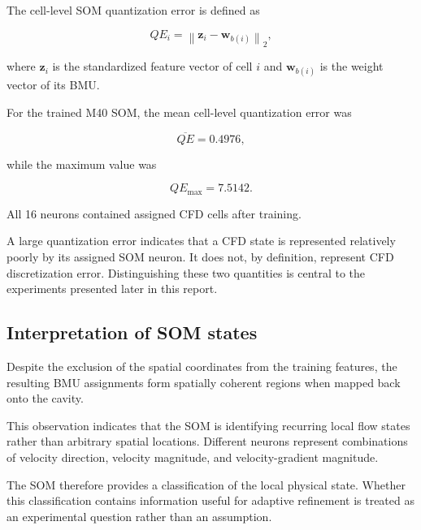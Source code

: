 The cell-level SOM quantization error is defined as

\begin{equation}
QE_i =
\left\|
\mathbf{z}_i-\mathbf{w}_{b(i)}
\right\|_2,
\end{equation}

where \(\mathbf{z}_i\) is the standardized feature vector of cell \(i\) and
\(\mathbf{w}_{b(i)}\) is the weight vector of its BMU.

For the trained M40 SOM, the mean cell-level quantization error was

\begin{equation}
\overline{QE}=0.4976,
\end{equation}

while the maximum value was

\begin{equation}
QE_{\max}=7.5142.
\end{equation}

All 16 neurons contained assigned CFD cells after training.

A large quantization error indicates that a CFD state is represented
relatively poorly by its assigned SOM neuron. It does not, by definition,
represent CFD discretization error. Distinguishing these two quantities is
central to the experiments presented later in this report.

\subsection{Interpretation of SOM states}

Despite the exclusion of the spatial coordinates from the training features,
the resulting BMU assignments form spatially coherent regions when mapped
back onto the cavity.

This observation indicates that the SOM is identifying recurring local flow
states rather than arbitrary spatial locations. Different neurons represent
combinations of velocity direction, velocity magnitude, and velocity-gradient
magnitude.

The SOM therefore provides a classification of the local physical state.
Whether this classification contains information useful for adaptive
refinement is treated as an experimental question rather than an assumption.

